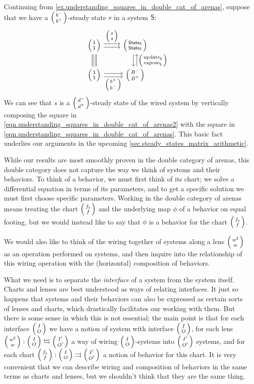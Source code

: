 \documentclass[DynamicalBook]{subfiles}
\begin{document}
\begin{example}\label{ex.understanding_squares_in_double_cat_of_arenas2}
  Continuing from \cref{ex.understanding_squares_in_double_cat_of_arenas},
  suppose that we have a $\lens{b^-}{b^+}$-steady state $s$ in a system $\mathsf{S}$:
  \begin{equation}\label{eqn.understanding_squares_in_double_cat_of_arenas2}
    \begin{tikzcd}
      \lens{\ord{1}}{\ord{1}} \ar[r, shift left, "\lens{s}{s}"] \ar[r, shift
      right] \ar[d, shift right, equals] \ar[d, shift left, equals] &
      \lens{\State{S}}{\State{S}} \ar[d, shift left, leftarrow,
      "\lens{\update{S}}{\expose{S}}"] \ar[d, shift right]\\
      \lens{\ord{1}}{\ord{1}} \ar[r, shift right, "\lens{b^+}{b^-}"'] \ar[r,
      shift left] & \lens{B^-}{B^+}
    \end{tikzcd}
  \end{equation}
  We can see that $s$ is a $\lens{d^-}{d^+}$-steady state of the wired system by
  vertically composing the square in
  \cref{eqn.understanding_squares_in_double_cat_of_arenas2} with the square in
  \cref{eqn.understanding_squares_in_double_cat_of_arenas}. This basic fact
  underlies our arguments in the upcoming \cref{sec.steady_states_matrix_arithmetic}. 
\end{example}

While our results are most smoothly proven in the double category of arenas,
this double category does not capture the way we think of systems and their
behaviors. To think of a behavior, we must first think of its chart; we solve a
differential equation in terms of its parameters, and to get a specific solution
we must first choose specific parameters. Working in the double category of
arenas means treating the chart $\lens{f_{\flat}}{f}$ and the underlying map
$\phi$ of a behavior on equal footing, but we would instead like to say that
$\phi$ is a behavior for the chart $\lens{f_{\flat}}{f}$. 

We would also like to think of the wiring together of systems along a lens
$\lens{w^{\sharp}}{w}$ as an operation performed on systems, and then inquire
into the relationship of this wiring operation with the (horizontal) composition
of behaviors.

What we need is to separate the \emph{interface} of a system from the system
itself. Charts and lenses are best understood as ways of relating interfaces. It just
so happens that systems and their behaviors can also be expressed as certain
sorts of lenses and charts, which drastically facilitates our working with them.
But there is some sense in which this is not essential; the main point is that
for each interface $\lens{I}{O}$ we have a notion of system with interface
$\lens{I}{O}$, for each lens $\lens{w^{\sharp}}{w} : \lens{I}{O} \fromto
\lens{I'}{O'}$ a way of wiring $\lens{I}{O}$-systems into $\lens{I'}{O'}$
systems, and for each chart $\lens{f_{\flat}}{f} : \lens{I}{O} \tto
\lens{I'}{O'}$ a notion of behavior for this chart. It is very convenient that
we can describe wiring and composition of behaviors in the same terms as charts
and lenses, but we shouldn't think that they are the same thing.
\end{document}
